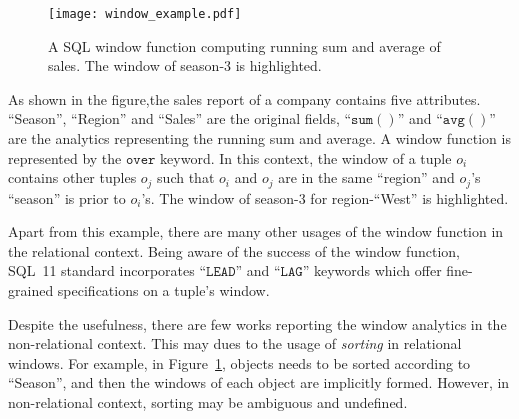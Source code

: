 \begin{figure}[h]
\centering
\texttt{[image: window\_example.pdf]}
\caption{A SQL window function computing running sum and average of
sales. The window of season-3 is highlighted.} 
\label{fig:window}
\end{figure}

As shown in the figure,the sales report of a company contains five attributes. 
``Season'', ``Region'' and ``Sales'' are the original fields, ``$\mathtt{sum()}$'' and ``$\mathtt{avg()}$''
are the analytics representing the running sum and average. A window function
is represented by the $\mathtt{over}$ keyword. In this context, the window of a tuple $o_i$
contains other tuples $o_j$ such that $o_i$ and $o_j$ are in the same ``region'' and $o_j$'s ``season'' is
prior to $o_i$'s. The window of season-$3$ for region-``West'' is highlighted.

Apart from this example, there are many other 
usages of the window function in the relational context. 
Being aware of the success of the window function, 
SQL~11 standard incorporates ``$\mathtt{LEAD}$'' and ``$\mathtt{LAG}$'' 
keywords which offer fine-grained specifications on a tuple's window.

Despite the usefulness, there are few works reporting the window
analytics in the non-relational context. This may dues to the
usage of \emph{sorting} in relational windows. For example,
in Figure~\ref{fig:window},
objects needs to be sorted according to ``Season'', and then the windows of
each object are implicitly formed. However, 
in non-relational context, sorting may be ambiguous and undefined.

